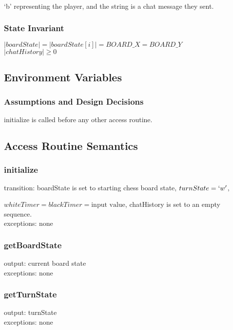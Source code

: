 \documentclass[12pt, titlepage]{article}
\begin{document}
            `b' representing the player, and the string is a chat message they sent. \\
            
        \subsubsection*{State Invariant}
            $|boardState| = |boardState[i]| = BOARD\_X = BOARD\_Y$ \\
            $|chatHistory| \geq 0$
            
    \subsection*{Environment Variables}
        \subsubsection*{Assumptions and Design Decisions}
            initialize is called before any other access routine.
            
    \subsection*{Access Routine Semantics}
        \subsubsection*{initialize} 
            transition: boardState is set to starting chess board state, $turnState = `w'$, 
            
            $whiteTimer = blackTimer = \textrm{input value}$, chatHistory is set to an empty sequence. \\
            exceptions: none
            
        \subsubsection*{getBoardState} 
            output: current board state \\
            exceptions: none
        
        \subsubsection*{getTurnState} 
            output: turnState \\
            exceptions: none
        
\end{document}
